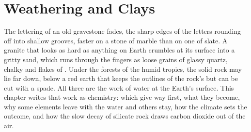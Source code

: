 \chapter{Weathering and Clays}\label{ch:b1:weathering-clays}

The lettering of an old gravestone fades, the sharp edges of the letters
rounding off into shallow grooves, faster on a stone of marble than on one of
slate. A granite  that looks as hard as anything on Earth crumbles at
its surface into a gritty sand, which runs through the fingers as loose grains
of glassy quartz, chalky  and flakes of . Under the forests of the
humid tropics, the solid rock may lie far down, below a red earth
that keeps the outlines of the rock's  but can be cut with a spade.
All three are the work of water at the Earth's surface. This chapter writes
that work as chemistry: which  give way first, what they become, why
some elements leave with the water and others stay, how the climate sets the
outcome, and how the slow decay of silicate rock draws carbon dioxide out of
the air.

